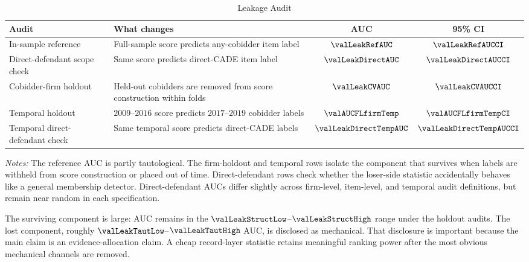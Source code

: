 \begin{table}[htbp]
\centering
\caption{Leakage Audit}
\label{tab:leakage_audit_submission}
\footnotesize
\begin{adjustbox}{max width=\textwidth,center}
\begin{threeparttable}
\begin{tabular}{L{4.4cm}L{5.4cm}cc}
\toprule
Audit & What changes & AUC & 95\% CI \\
\midrule
In-sample reference & Full-sample score predicts any-cobidder item label
& $\valLeakRefAUC$ & $\valLeakRefAUCCI$ \\
Direct-defendant scope check & Same score predicts direct-CADE item label
& $\valLeakDirectAUC$ & $\valLeakDirectAUCCI$ \\
Cobidder-firm holdout & Held-out cobidders are removed from score construction within folds
& $\valLeakCVAUC$ & $\valLeakCVAUCCI$ \\
Temporal holdout & $2009$--$2016$ score predicts $2017$--$2019$ cobidder labels
& $\valAUCFLfirmTemp$ & $\valAUCFLfirmTempCI$ \\
Temporal direct-defendant check & Same temporal score predicts direct-CADE labels
& $\valLeakDirectTempAUC$ & $\valLeakDirectTempAUCCI$ \\
\bottomrule
\end{tabular}
\begin{tablenotes}
\footnotesize
\item \textit{Notes:} The reference AUC is partly tautological.
The firm-holdout and temporal rows isolate the component that
survives when labels are withheld from score construction or
placed out of time. Direct-defendant rows check whether the
loser-side statistic accidentally behaves like a general
membership detector.
Direct-defendant AUCs differ slightly across firm-level,
item-level, and temporal audit definitions, but remain near
random in each specification.
\end{tablenotes}
\end{threeparttable}
\end{adjustbox}
\end{table}

The surviving component is large: AUC remains in the
$\valLeakStructLow$--$\valLeakStructHigh$ range under the
holdout audits. The lost component, roughly
$\valLeakTautLow$--$\valLeakTautHigh$ AUC, is disclosed as
mechanical. That disclosure is important because the main claim
is an evidence-allocation claim. A cheap record-layer statistic
retains meaningful ranking power after the most obvious
mechanical channels are removed.

